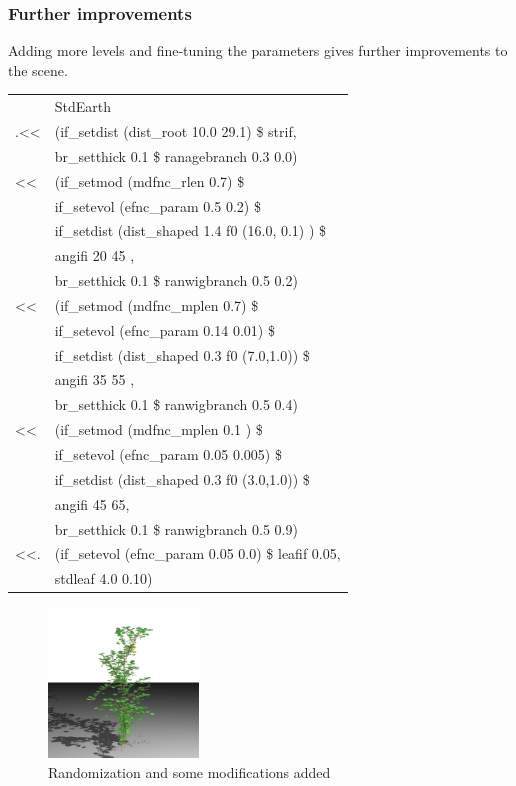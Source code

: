 \subsubsection{Further improvements}

    Adding more levels and fine-tuning the parameters gives further improvements
    to the scene.\\

\begin{tabular}{ll}
  &StdEarth\\
  .<<&(if\_setdist (dist\_root 10.0 29.1) \$ strif,\\
  &br\_setthick 0.1 \$ ranagebranch 0.3 0.0)\\
             
         <<&(if\_setmod (mdfnc\_rlen 0.7)  \$\\ 
           &if\_setevol (efnc\_param 0.5 0.2) \$\\ 
           &if\_setdist (dist\_shaped 1.4 f0 (16.0, 0.1) ) \$\\ 
           &angifi 20 45 ,\\ 
           &br\_setthick 0.1 \$ ranwigbranch 0.5 0.2)\\

         <<&(if\_setmod (mdfnc\_mplen 0.7)  \$ \\
           &if\_setevol (efnc\_param 0.14 0.01) \$ \\
           &if\_setdist (dist\_shaped 0.3 f0 (7.0,1.0)) \$ \\
           &angifi 35 55 , \\
           &br\_setthick 0.1 \$ ranwigbranch 0.5 0.4) \\
             
         <<&(if\_setmod (mdfnc\_mplen 0.1 ) \$ \\
           &if\_setevol (efnc\_param 0.05 0.005) \$ \\
           &if\_setdist (dist\_shaped 0.3 f0 (3.0,1.0)) \$ \\
           &angifi 45 65, \\
           &br\_setthick 0.1 \$ ranwigbranch 0.5 0.9) \\
         <<.&(if\_setevol (efnc\_param 0.05 0.0) \$ leafif 0.05, \\
            &stdleaf 4.0 0.10) \\
	
\end{tabular}


\begin{figure}[htb]
        \centering
        \includegraphics[height=4cm,width=4cm, angle=0]{images/dbex3}
        \caption{Randomization and some modifications added}
        \label{fig:graph5}
\end{figure}



      
